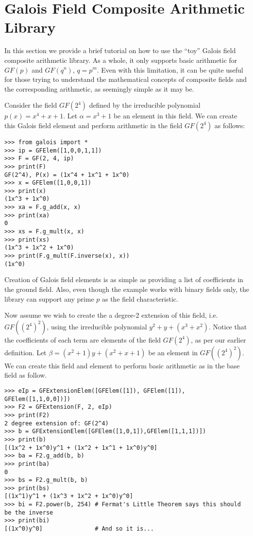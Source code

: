 %   

\section{Galois Field Composite Arithmetic Library}
In this section we provide a brief tutorial on how to use the ``toy'' Galois field composite arithmetic library.
As a whole, it only supports basic arithmetic for $GF(p)$ and $GF(q^n)$, $q = p^m$. Even with this limitation,
it can be quite useful for those trying to understand the mathematical concepts of composite fields
and the corresponding arithmetic, as seemingly simple as it may be. 

Consider the field $GF(2^4)$ defined by the irreducible polynomial $p(x) = x^4 + x + 1$. Let $\alpha = x^3 + 1$ be an element in this field. We can
create this Galois field element and perform arithmetic in the field $GF(2^4)$ as follows:

\begin{verbatim}
>>> from galois import *
>>> ip = GFElem([1,0,0,1,1]) 
>>> F = GF(2, 4, ip)
>>> print(F)
GF(2^4), P(x) = (1x^4 + 1x^1 + 1x^0)
>>> x = GFElem([1,0,0,1])
>>> print(x)
(1x^3 + 1x^0)
>>> xa = F.g_add(x, x)
>>> print(xa)
0
>>> xs = F.g_mult(x, x)
>>> print(xs)
(1x^3 + 1x^2 + 1x^0)
>>> print(F.g_mult(F.inverse(x), x))
(1x^0)
\end{verbatim} 

Creation of Galois field elements is as simple as providing a list of coefficients in the 
ground field. Also, even though the example works with binary fields only, the library 
can support any prime $p$ as the field characteristic. 

Now assume we wish to create the a degree-2 extension of this field, i.e. $GF((2^4)^2)$, 
using the irreducible polynomial $y^2 + y + (x^3 + x^2)$. Notice that the coefficients of
each term are elements of the field $GF(2^4)$, as per our earlier definition. Let 
$\beta = (x^2 + 1)y + (x^2 + x + 1)$ be an element in $GF((2^4)^2)$. We can create this field
and element to perform basic arithmetic as in the base field as follow.

\begin{verbatim}
>>> eIp = GFExtensionElem([GFElem([1]), GFElem([1]), GFElem([1,1,0,0])]) 
>>> F2 = GFExtension(F, 2, eIp)
>>> print(F2)
2 degree extension of: GF(2^4)
>>> b = GFExtensionElem([GFElem([1,0,1]),GFElem([1,1,1])])
>>> print(b)
[(1x^2 + 1x^0)y^1 + (1x^2 + 1x^1 + 1x^0)y^0]
>>> ba = F2.g_add(b, b)
>>> print(ba)
0
>>> bs = F2.g_mult(b, b)
>>> print(bs)
[(1x^1)y^1 + (1x^3 + 1x^2 + 1x^0)y^0]
>>> bi = F2.power(b, 254) # Fermat's Little Theorem says this should be the inverse
>>> print(bi) 
[(1x^0)y^0]               # And so it is...
\end{verbatim}


